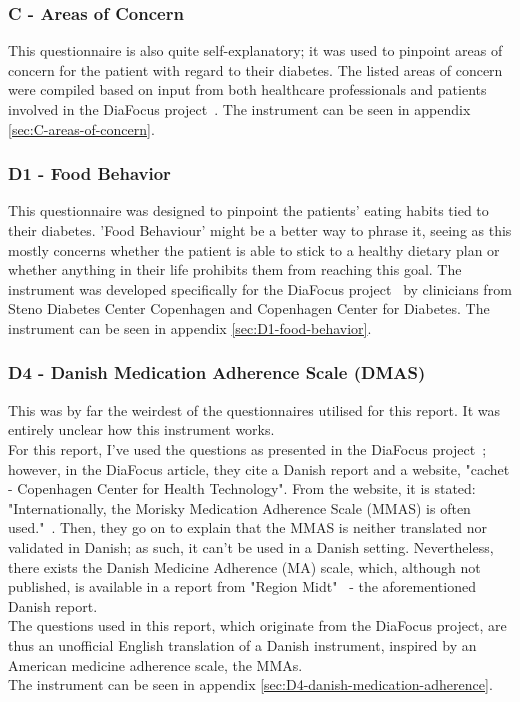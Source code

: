 \subsubsection*{C - Areas of Concern}
This questionnaire is also quite self-explanatory; it was used to pinpoint areas of concern for the patient with regard to their diabetes. The listed areas of concern were compiled based on input from both healthcare professionals and patients involved in the DiaFocus project~\cite{DiaFocus}. The instrument can be seen in appendix \autoref{sec:C-areas-of-concern}.

\subsubsection*{D1 - Food Behavior}
This questionnaire was designed to pinpoint the patients' eating habits tied to their diabetes. 'Food Behaviour' might be a better way to phrase it, seeing as this mostly concerns whether the patient is able to stick to a healthy dietary plan or whether anything in their life prohibits them from reaching this goal. The instrument was developed specifically for the DiaFocus project~\cite{DiaFocus} by clinicians from Steno Diabetes Center Copenhagen and Copenhagen Center for Diabetes. The instrument can be seen in appendix \autoref{sec:D1-food-behavior}.

\subsubsection*{D4 - Danish Medication Adherence Scale (DMAS)}
This was by far the weirdest of the questionnaires utilised for this report. It was entirely unclear how this instrument works.
\\
For this report, I've used the questions as presented in the DiaFocus project~\cite{DiaFocus}; however, in the DiaFocus article, they cite a Danish report and a website, "cachet - Copenhagen Center for Health Technology". From the website, it is stated: "Internationally, the Morisky Medication Adherence Scale (MMAS) is often used."~\cite{cachet-CCHT}. Then, they go on to explain that the MMAS is neither translated nor validated in Danish; as such, it can't be used in a Danish setting. Nevertheless, there exists the Danish Medicine Adherence (MA) scale, which, although not published, is available in a report from "Region Midt"~\cite{Danish-Medicine-Adherence-Scale} - the aforementioned Danish report.
\\
The questions used in this report, which originate from the DiaFocus project, are thus an unofficial English translation of a Danish instrument, inspired by an American medicine adherence scale, the MMAs.
\\
The instrument can be seen in appendix \autoref{sec:D4-danish-medication-adherence}.

